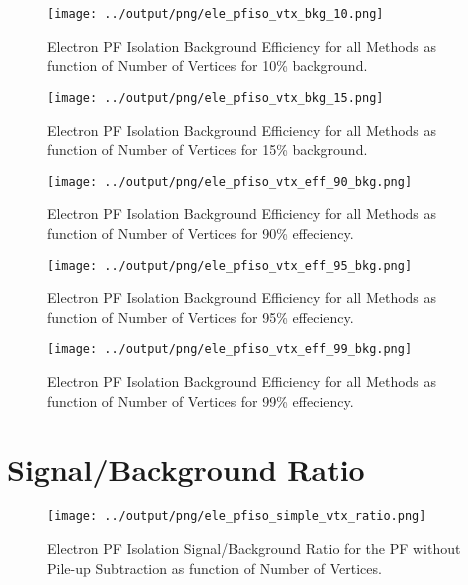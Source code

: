 \documentclass[11pt]{book}
\begin{document}
\begin{figure}[htb]
\centering
\texttt{[image: ../output/png/ele\_pfiso\_vtx\_bkg\_10.png]}
\caption{Electron PF Isolation Background Efficiency for all Methods as function of Number of Vertices for 10\% background.}
\label{fig:ele_pfiso_vtx_bkg_10}
\end{figure}

\begin{figure}[htb]
\centering
\texttt{[image: ../output/png/ele\_pfiso\_vtx\_bkg\_15.png]}
\caption{Electron PF Isolation Background Efficiency for all Methods as function of Number of Vertices for 15\% background.}
\label{fig:ele_pfiso_vtx_bkg_15}
\end{figure}

\begin{figure}[htb]
\centering
\texttt{[image: ../output/png/ele\_pfiso\_vtx\_eff\_90\_bkg.png]}
\caption{Electron PF Isolation Background Efficiency for all Methods as function of Number of Vertices for 90\% effeciency.}
\label{fig:ele_pfiso_vtx_eff_90_bkg}
\end{figure}

\begin{figure}[htb]
\centering
\texttt{[image: ../output/png/ele\_pfiso\_vtx\_eff\_95\_bkg.png]}
\caption{Electron PF Isolation Background Efficiency for all Methods as function of Number of Vertices for 95\% effeciency.}
\label{fig:ele_pfiso_vtx_eff_95_bkg}
\end{figure}

\begin{figure}[htb]
\centering
\texttt{[image: ../output/png/ele\_pfiso\_vtx\_eff\_99\_bkg.png]}
\caption{Electron PF Isolation Background Efficiency for all Methods as function of Number of Vertices for 99\% effeciency.}
\label{fig:ele_pfiso_vtx_eff_99_bkg}
\end{figure}
\clearpage

\section{Signal/Background Ratio}
\begin{figure}[htb]
\centering
\texttt{[image: ../output/png/ele\_pfiso\_simple\_vtx\_ratio.png]}
\caption{Electron PF Isolation Signal/Background Ratio for the PF without Pile-up Subtraction as function of Number of Vertices.}
\label{fig:ele_pfiso_vtx_ratio_simple}
\end{figure}
\end{document}
